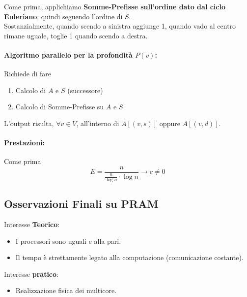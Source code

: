 	Come prima, applichiamo \textbf{Somme-Prefisse sull'ordine dato dal ciclo Euleriano}, quindi seguendo l'ordine di $S$.\\
	
	Sostanzialmente, quando scendo a sinistra aggiunge 1, quando vado al centro rimane uguale, toglie 1 quando scendo a destra.\\
	
	\paragraph{Algoritmo parallelo per la profondità $P(v)$:} Richiede di fare
	\begin{enumerate}
		\item Calcolo di $A$ e $S$ (successore)
		\item Calcolo di Somme-Prefisse su $A$ e $S$
	\end{enumerate}
	L'output risulta, $\forall v \in V$, all'interno di $A[(v,s)]$ oppure $A[(v,d)]$.\\
	
	\paragraph{Prestazioni:} Come prima
	$$ E = \frac{n}{\frac{n}{\log n} \cdot \log n} \rightarrow c \neq 0 $$
	
	\newpage
	
	\subsection*{Osservazioni Finali su PRAM}
	
	Interesse \textbf{Teorico}: 
	\begin{itemize}
		\item I processori sono uguali e alla pari.\\
		
		\item Il tempo è strettamente legato alla computazione (comunicazione costante).\\
	\end{itemize}
	
	Interesse \textbf{pratico}: 
	\begin{itemize}
		\item Realizzazione fisica dei multicore.\\
	\end{itemize}
	
